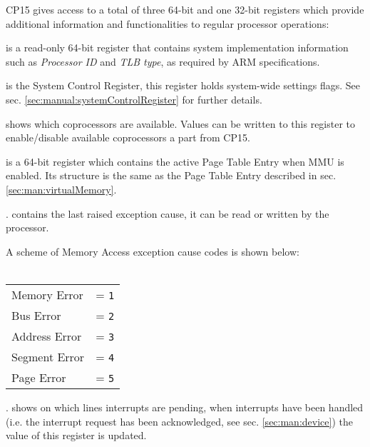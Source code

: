 

CP15 gives access to a total of three 64-bit and one 32-bit registers which provide additional information and functionalities to regular processor operations:

 is a read-only 64-bit register that contains system implementation information such as \emph{Processor ID} and \emph{TLB type}, as required by ARM specifications.

 is the System Control Register, this register holds system-wide settings flags.
See sec. \ref{sec:manual:systemControlRegister} for further details.

 shows which coprocessors are available. Values can be written to this register to enable/disable available coprocessors a part from CP15.


 is a 64-bit register which contains the active Page Table Entry when MMU is enabled. Its structure is the same as the Page Table Entry described in sec. \ref{sec:man:virtualMemory}.

. contains the last raised exception cause, it can be read or written by the processor.

A scheme of Memory Access exception cause codes is shown below:
\\
\\
\begin{tabular}{ll}
Memory Error & = \texttt{1}\\
Bus Error & = \texttt{2}\\
Address Error & = \texttt{3}\\
Segment Error & = \texttt{4}\\
Page Error & = \texttt{5}\\
\end{tabular}

. shows on which lines interrupts are pending, when interrupts have been handled (i.e. the interrupt request has been acknowledged, see sec. \ref{sec:man:device}) the value of this register is updated.

